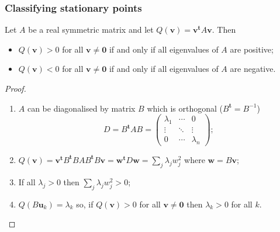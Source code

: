 \documentclass[aspectratio=169,handout]{beamer}
\newcommand{\uu}{\mathbf{u}}
\newcommand{\vv}{\mathbf{v}}
\newcommand{\ww}{\mathbf{w}}
\begin{document}
\begin{frame}
    \frametitle{Classifying stationary points}


    \begin{theorem}
        Let \(A\) be a real symmetric matrix and let
        \(Q(\vv) =  \vv^{\mathbf{t}} A  \vv  \).
        Then
        \begin{itemize}
            \item \(Q(\vv) > 0\) for all \(\vv \neq \mathbf{0}\) if and only if all eigenvalues of \(A\) are positive;
            \item \(Q(\vv) < 0\) for all \(\vv \neq \mathbf{0}\) if and only if all eigenvalues of \(A\) are negative.
        \end{itemize}
    \end{theorem}

    \begin{proof}
        \begin{enumerate}
            \item \(A\) can be diagonalised by  matrix \(B\)  which is orthogonal (\(B^{\mathbf{t}}=B^{-1}\))
                  \[
                      D = B^{\mathbf{t}} A B =
                      \begin{pmatrix}
                          \lambda_1 & \cdots & 0         \\
                          \vdots    & \ddots & \vdots    \\
                          0         & \cdots & \lambda_n
                      \end{pmatrix};
                  \]
                  \vspace{-1em}
            \item \(Q(\vv) = \vv^{\mathbf{t}} B^{\mathbf{t}} B A B^{\mathbf{t}} B \vv  = \ww^{\mathbf{t}} D \ww = \sum_{j} \lambda_j w_j^2  \) where \(\ww = B \vv\);
            \item If all \(\lambda_j >0\) then \( \sum_{j} \lambda_j w_j^2  >0\);
            \item \(Q(B \uu_k ) = \lambda_k\) so, if \(Q(\vv) > 0\) for all \(\vv \neq \mathbf{0}\) then \(\lambda_k>0\) for all \(k\). \qedhere
        \end{enumerate}
    \end{proof}

\end{frame}
\end{document}
